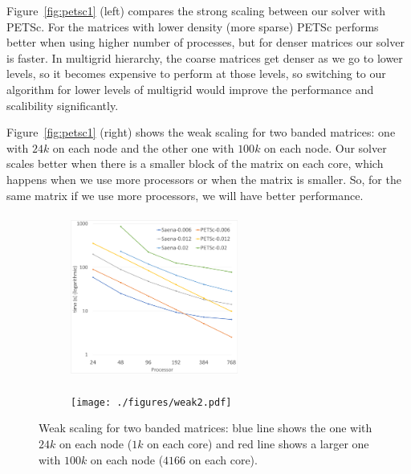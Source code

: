 Figure~\ref{fig:petsc1} (left) compares the strong scaling between our solver with PETSc. For the matrices with lower density (more sparse) PETSc performs better when using higher number of processes, but for denser matrices our solver is faster. In multigrid hierarchy, the coarse matrices get denser as we go to lower levels, so it becomes expensive to perform \mm at those levels, so switching to our algorithm for lower levels of multigrid would improve the performance and scalibility significantly.

Figure~\ref{fig:petsc1} (right) shows the weak scaling for two banded matrices: one with $24k$ on each node and the other one with $100k$ on each node. Our solver scales better when there is a smaller block of the matrix on each core, which happens when we use more processors or when the matrix is smaller. So, for the same matrix if we use more processors, we will have better performance.

\begin{figure}[tbh]
    \centering
    \begin{subfigure}{.45\textwidth}
        \centering
        \includegraphics[width=5.5cm,height=5.4cm]{./figures/strong_size_vs_petsc.pdf}
    \end{subfigure}
    \begin{subfigure}{.45\textwidth}
        \centering
        \texttt{[image: ./figures/weak2.pdf]}
    \end{subfigure}
    \caption{Weak scaling for two banded matrices: blue line shows the one with $24k$ on each node ($1k$ on each core) and red line shows a larger one with $100k$ on each node ($4166$ on each core).}
    \label{fig:weak}
\end{figure}


